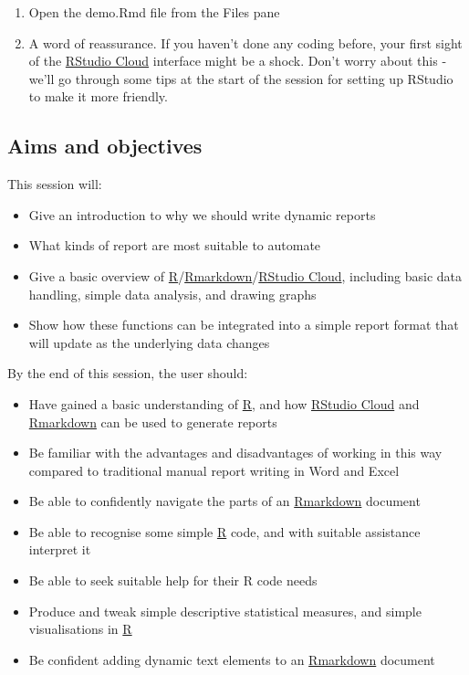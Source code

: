 \documentclass[
]{article}
\providecommand{\tightlist}{%
  \setlength{\itemsep}{0pt}\setlength{\parskip}{0pt}}
\begin{document}
\begin{enumerate}
\def\labelenumi{\arabic{enumi}.}
\setcounter{enumi}{4}
\tightlist
\item
  Open the demo.Rmd file from the Files pane
\item
  A word of reassurance. If you haven't done any coding before, your
  first sight of the \href{https://rstudio.cloud}{RStudio Cloud}
  interface might be a shock. Don't worry about this - we'll go through
  some tips at the start of the session for setting up RStudio to make
  it more friendly.
\end{enumerate}

\hypertarget{aims-and-objectives}{%
\subsection{Aims and objectives}\label{aims-and-objectives}}

This session will:

\begin{itemize}
\tightlist
\item
  Give an introduction to why we should write dynamic reports
\item
  What kinds of report are most suitable to automate
\item
  Give a basic overview of
  \href{https://www.r-project.org/}{R}/\href{http://rmarkdown.rstudio.com}{Rmarkdown}/\href{https://rstudio.cloud}{RStudio
  Cloud}, including basic data handling, simple data analysis, and
  drawing graphs
\item
  Show how these functions can be integrated into a simple report format
  that will update as the underlying data changes
\end{itemize}

By the end of this session, the user should:

\begin{itemize}
\tightlist
\item
  Have gained a basic understanding of
  \href{https://www.r-project.org/}{R}, and how
  \href{https://rstudio.cloud}{RStudio Cloud} and
  \href{http://rmarkdown.rstudio.com}{Rmarkdown} can be used to generate
  reports
\item
  Be familiar with the advantages and disadvantages of working in this
  way compared to traditional manual report writing in Word and Excel
\item
  Be able to confidently navigate the parts of an
  \href{http://rmarkdown.rstudio.com}{Rmarkdown} document
\item
  Be able to recognise some simple \href{https://www.r-project.org/}{R}
  code, and with suitable assistance interpret it
\item
  Be able to seek suitable help for their R code needs
\item
  Produce and tweak simple descriptive statistical measures, and simple
  visualisations in \href{https://www.r-project.org/}{R}
\item
  Be confident adding dynamic text elements to an
  \href{http://rmarkdown.rstudio.com}{Rmarkdown} document
\end{itemize}
\end{document}
